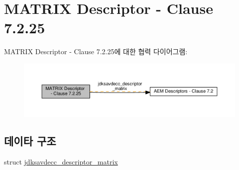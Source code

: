 \hypertarget{group__descriptor__matrix}{}\section{M\+A\+T\+R\+IX Descriptor -\/ Clause 7.2.25}
\label{group__descriptor__matrix}
M\+A\+T\+R\+IX Descriptor -\/ Clause 7.2.25에 대한 협력 다이어그램\+:
\nopagebreak
\begin{figure}[H]
\begin{center}
\leavevmode
\includegraphics[width=350pt]{group__descriptor__matrix}
\end{center}
\end{figure}
\subsection*{데이타 구조}
\begin{DoxyCompactItemize}
\item 
struct \hyperlink{structjdksavdecc__descriptor__matrix}{jdksavdecc\+\_\+descriptor\+\_\+matrix}
\end{DoxyCompactItemize}
